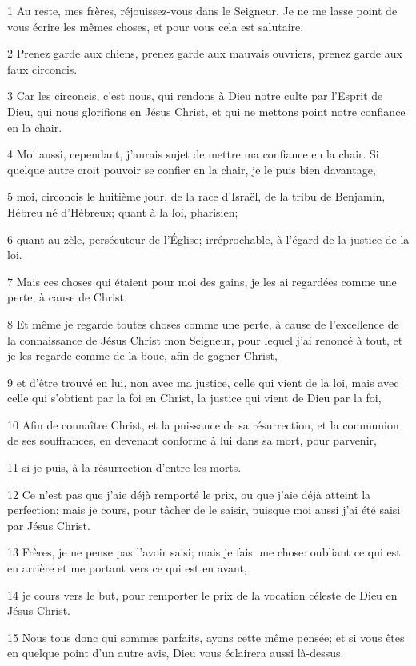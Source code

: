 \par 1 Au reste, mes frères, réjouissez-vous dans le Seigneur. Je ne me lasse point de vous écrire les mêmes choses, et pour vous cela est salutaire.
\par 2 Prenez garde aux chiens, prenez garde aux mauvais ouvriers, prenez garde aux faux circoncis.
\par 3 Car les circoncis, c'est nous, qui rendons à Dieu notre culte par l'Esprit de Dieu, qui nous glorifions en Jésus Christ, et qui ne mettons point notre confiance en la chair.
\par 4 Moi aussi, cependant, j'aurais sujet de mettre ma confiance en la chair. Si quelque autre croit pouvoir se confier en la chair, je le puis bien davantage,
\par 5 moi, circoncis le huitième jour, de la race d'Israël, de la tribu de Benjamin, Hébreu né d'Hébreux; quant à la loi, pharisien;
\par 6 quant au zèle, persécuteur de l'Église; irréprochable, à l'égard de la justice de la loi.
\par 7 Mais ces choses qui étaient pour moi des gains, je les ai regardées comme une perte, à cause de Christ.
\par 8 Et même je regarde toutes choses comme une perte, à cause de l'excellence de la connaissance de Jésus Christ mon Seigneur, pour lequel j'ai renoncé à tout, et je les regarde comme de la boue, afin de gagner Christ,
\par 9 et d'être trouvé en lui, non avec ma justice, celle qui vient de la loi, mais avec celle qui s'obtient par la foi en Christ, la justice qui vient de Dieu par la foi,
\par 10 Afin de connaître Christ, et la puissance de sa résurrection, et la communion de ses souffrances, en devenant conforme à lui dans sa mort, pour parvenir,
\par 11 si je puis, à la résurrection d'entre les morts.
\par 12 Ce n'est pas que j'aie déjà remporté le prix, ou que j'aie déjà atteint la perfection; mais je cours, pour tâcher de le saisir, puisque moi aussi j'ai été saisi par Jésus Christ.
\par 13 Frères, je ne pense pas l'avoir saisi; mais je fais une chose: oubliant ce qui est en arrière et me portant vers ce qui est en avant,
\par 14 je cours vers le but, pour remporter le prix de la vocation céleste de Dieu en Jésus Christ.
\par 15 Nous tous donc qui sommes parfaits, ayons cette même pensée; et si vous êtes en quelque point d'un autre avis, Dieu vous éclairera aussi là-dessus.

